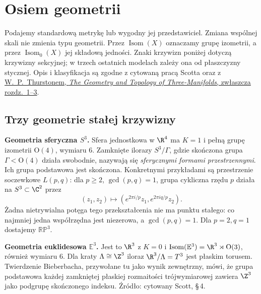 \section{Osiem geometrii}
\label{sec:thurston-eight}

Podajemy standardową metrykę lub wygodny jej przedstawiciel.
Zmiana wspólnej skali nie zmienia typu geometrii. Przez
$\operatorname{Isom}(X)$ oznaczamy grupę izometrii, a przez
$\operatorname{Isom}_0(X)$ jej składową jedności. Znaki krzywizn
poniżej dotyczą krzywizny sekcyjnej; w trzech ostatnich modelach
zależy ona od płaszczyzny stycznej. Opis i klasyfikacja są zgodne
z cytowaną pracą Scotta oraz z
\href{https://library.slmath.org/nonmsri/gt3m/PDF/Thurston-gt3m.pdf}
{W.\ P.\ Thurstonem, \emph{The Geometry and Topology of
Three-Manifolds}, zwłaszcza rozdz.\ 1--3}.

\subsection*{Trzy geometrie stałej krzywizny}

\textbf{Geometria sferyczna $S^3$.}
Sfera jednostkowa w $\R^4$ ma $K=1$ i pełną grupę izometrii
$\mathrm O(4)$, wymiaru $6$. Zamknięte ilorazy $S^3/\Gamma$,
gdzie skończona grupa $\Gamma<\mathrm O(4)$ działa swobodnie,
nazywają się \emph{sferycznymi formami przestrzennymi}.
Ich grupa podstawowa jest skończona.
Konkretnymi przykładami są przestrzenie soczewkowe
$L(p,q)$: dla $p\geq2$, $\gcd(p,q)=1$, grupa cykliczna rzędu $p$
działa na $S^3\subset\C^2$ przez
\[
 (z_1,z_2)\longmapsto
 (e^{2\pi i/p}z_1,e^{2\pi iq/p}z_2).
\]
Żadna nietrywialna potęga tego przekształcenia nie ma punktu
stałego: co najmniej jedna współrzędna jest niezerowa, a
$\gcd(p,q)=1$. Dla $p=2,q=1$ dostajemy $\mathbb{RP}^3$.

\textbf{Geometria euklidesowa $\mathbb E^3$.}
Jest to $\R^3$ z $K=0$ i
$\operatorname{Isom}(\mathbb E^3)=\R^3\rtimes\mathrm O(3)$,
również wymiaru $6$. Dla kraty $\Lambda\cong\Z^3$ iloraz
$\R^3/\Lambda=T^3$ jest płaskim torusem. Twierdzenie Bieberbacha,
przywołane tu jako wynik zewnętrzny, mówi, że grupa podstawowa
każdej zamkniętej płaskiej rozmaitości trójwymiarowej zawiera $\Z^3$ jako
podgrupę skończonego indeksu. Źródło: cytowany Scott, \S\,4.

